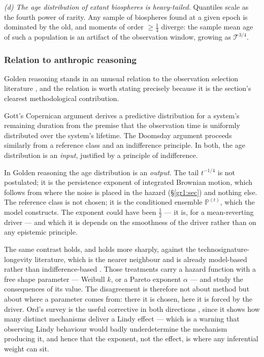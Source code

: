 \documentclass[11pt]{article}
\numberwithin{equation}{section}
\theoremstyle{plain}
\theoremstyle{definition}
\theoremstyle{remark}
\newcommand{\PP}{\mathbb{P}}
\begin{document}
\emph{(d) The age distribution of extant biospheres is heavy-tailed.}
Quantiles scale as the fourth power of rarity. Any sample of biospheres
found at a given epoch is dominated by the old, and moments of order
$\ge\tfrac14$ diverge: the sample mean age of such a population is an
artifact of the observation window, growing as $\mathcal T^{3/4}$.

\subsubsection{Relation to anthropic reasoning}\label{gr:subsub:anthropic}

Golden reasoning stands in an unusual relation to the observation
selection literature \cite{Car83,Got93,Bos02}, and the relation is worth
stating precisely because it is the section's clearest methodological
contribution.

Gott's Copernican argument \cite{Got93} derives a predictive
distribution for a system's remaining duration from the premise that the
observation time is uniformly distributed over the system's lifetime.
The Doomsday argument \cite{Car83,Bos02} proceeds similarly from a
reference class and an indifference principle. In both, the age
distribution is an \emph{input}, justified by a principle of
indifference.

In Golden reasoning the age distribution is an \emph{output}. The tail
$t^{-1/4}$ is not postulated; it is the persistence exponent of
integrated Brownian motion, which follows from where the noise is placed
in the hazard (\S\ref{gr1:sec}) and nothing else. The reference class is not
chosen; it is the conditioned ensemble $\PP^{(t)}$, which the model
constructs. The exponent could have been $\tfrac12$ --- it is, for a
mean-reverting driver --- and which it is depends on the smoothness of
the driver rather than on any epistemic principle.

The same contrast holds, and holds more sharply, against the
technosignature-longevity literature, which is the nearer neighbour and
is already model-based rather than indifference-based
\cite{BC21,BG24,Kip20}. Those treatments carry a hazard function with a
free shape parameter --- Weibull $k$, or a Pareto exponent $\alpha$ ---
and study the consequences of its value. The disagreement is therefore
not about method but about where a parameter comes from: there it is
chosen, here it is forced by the driver. Ord's survey is the useful
corrective in both directions \cite{Ord23}, since it shows how many
distinct mechanisms deliver a Lindy effect --- which is a warning that
observing Lindy behaviour would badly underdetermine the mechanism
producing it, and hence that the exponent, not the effect, is where any
inferential weight can sit.
\end{document}

